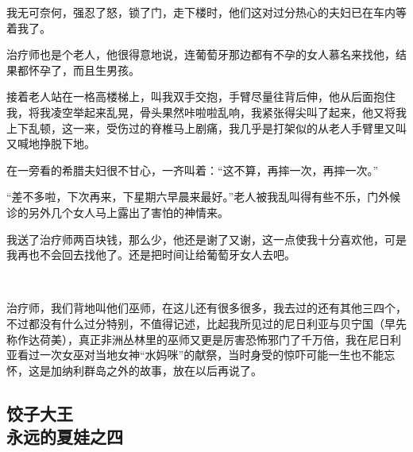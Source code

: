 \par 我无可奈何，强忍了怒，锁了门，走下楼时，他们这对过分热心的夫妇已在车内等着我了。
\par 治疗师也是个老人，他很得意地说，连葡萄牙那边都有不孕的女人慕名来找他，结果都怀孕了，而且生男孩。
\par 接着老人站在一格高楼梯上，叫我双手交抱，手臂尽量往背后伸，他从后面抱住我，将我凌空举起来乱晃，骨头果然咔啦啦乱响，我紧张得尖叫了起来，他又将我上下乱顿，这一来，受伤过的脊椎马上剧痛，我几乎是打架似的从老人手臂里又叫又喊地挣脱下地。
\par 在一旁看的希腊夫妇很不甘心，一齐叫着：“这不算，再摔一次，再摔一次。”
\par “差不多啦，下次再来，下星期六早晨来最好。”老人被我乱叫得有些不乐，门外候诊的另外几个女人马上露出了害怕的神情来。
\par 我送了治疗师两百块钱，那么少，他还是谢了又谢，这一点使我十分喜欢他，可是我再也不会回去找他了。还是把时间让给葡萄牙女人去吧。
\par  
\par 治疗师，我们背地叫他们巫师，在这儿还有很多很多，我去过的还有其他三四个，不过都没有什么过分特别，不值得记述，比起我所见过的尼日利亚与贝宁国（早先称作达荷美），真正非洲丛林里的巫师又更是厉害恐怖邪门了千万倍，我在尼日利亚看过一次女巫对当地女神“水妈咪”的献祭，当时身受的惊吓可能一生也不能忘怀，这是加纳利群岛之外的故事，放在以后再说了。



\subsection{饺子大王\\\small{永远的夏娃之四}}

